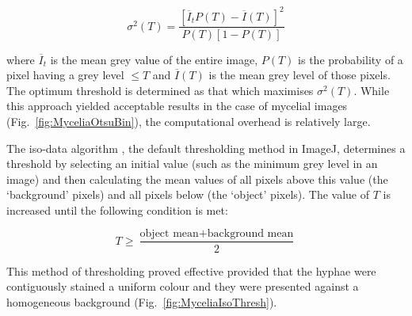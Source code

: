 \begin{equation}
	\sigma^2 (T) = \frac{[\overline{I}_t P(T) - \overline{I}(T)]^2}{P(T)[1-P(T)]}
\end{equation}

\noindent where $\overline{I}_t$ is the mean grey value of the entire image, $P(T)$ is the probability of a pixel having a grey level $\leq T$ and $\overline{I}(T)$ is the mean grey level of those pixels. The optimum threshold is determined as that which maximises $\sigma^2 (T)$. While this approach yielded acceptable results in the case of mycelial images (Fig.~\ref{fig:MyceliaOtsuBin}), the computational overhead is relatively large.

The iso-data algorithm \cite{ridler1978}, the default thresholding method in ImageJ, determines a threshold by selecting an initial value (such as the minimum grey level in an image) and then calculating the mean values of all pixels above this value (the \lq background' pixels) and all pixels below (the \lq object' pixels). The value of $T$ is increased until the following condition is met:

\begin{equation}
	T \geq \frac{\mbox{object mean} + \mbox{background mean}}{2}
\end{equation}

\noindent This method of thresholding proved effective provided that the hyphae were contiguously stained a uniform colour and they were presented against a homogeneous background (Fig.~\ref{fig:MyceliaIsoThresh}).

